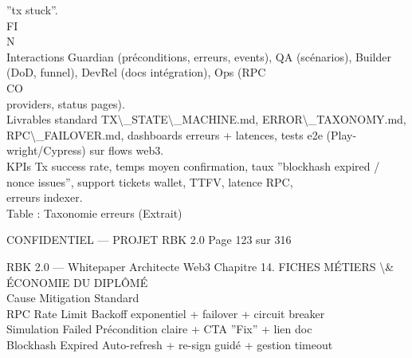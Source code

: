 ”tx stuck”.\\
\vspace{0.5em}
\vspace{0.5em}
\vspace{0.5em}
\vspace{0.5em}
FI\\
N\\
Interactions Guardian (préconditions, erreurs, events), QA (scénarios), Builder (DoD, funnel), DevRel (docs intégration), Ops (RPC\\
CO\\
providers, status pages).\\
\vspace{0.5em}
Livrables standard TX\textbackslash{}_STATE\textbackslash{}_MACHINE.md, ERROR\textbackslash{}_TAXONOMY.md, RPC\textbackslash{}_FAILOVER.md, dashboards erreurs + latences, tests e2e (Play-\\
wright/Cypress) sur flows web3.\\
\vspace{0.5em}
KPIs Tx success rate, temps moyen confirmation, taux ”blockhash expired / nonce issues”, support tickets wallet, TTFV, latence RPC,\\
erreurs indexer.\\
\vspace{0.5em}
Table : Taxonomie erreurs (Extrait)\\
\vspace{0.5em}
\vspace{0.5em}
\vspace{0.5em}
\vspace{0.5em}
\begin{confidential}CONFIDENTIEL — PROJET RBK 2.0                               Page 123 sur 316\end{confidential}
RBK 2.0 — Whitepaper Architecte Web3                                                Chapitre 14. FICHES MÉTIERS \textbackslash{}& ÉCONOMIE DU DIPLÔMÉ\\
\vspace{0.5em}
\vspace{0.5em}
\vspace{0.5em}
Cause                   Mitigation Standard\\
RPC Rate Limit          Backoff exponentiel + failover + circuit breaker\\
Simulation Failed       Précondition claire + CTA ”Fix” + lien doc\\
Blockhash Expired       Auto-refresh + re-sign guidé + gestion timeout\\
